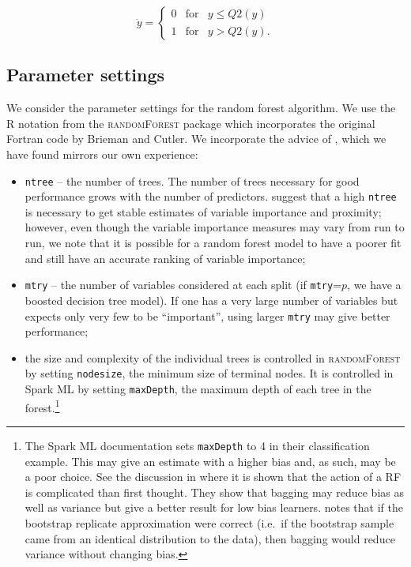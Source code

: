 \documentclass[10pt,letterpaper]{article}
\newcommand{\randomforest}{\textsc{randomForest}\xspace}
\newcommand{\mtry}{\texttt{mtry}\xspace}
\newcommand{\ntree}{\texttt{ntree}\xspace}
\begin{document}
$$
\ddot{y} =    \left\{ \begin{array}{rcl}
			  0 & \mbox{for} & y \leq Q2(y) \\
			  1 & \mbox{for} & y > Q2(y).
		 \end{array}\right. 
$$


\subsection{Parameter settings}
We consider the parameter settings for the random forest algorithm. We use the R notation from the \randomforest
package \cite{Liaw.and.Weiner.2002} which incorporates the original Fortran code by Brieman and Cutler.  We incorporate
the advice of \cite{Liaw.and.Weiner.2002}, which we have found mirrors our own experience:
\begin{itemize}
\item \ntree{}  -- the number of trees.  The number of trees necessary for good performance grows with the number of
  predictors.  \cite{Liaw.and.Weiner.2002} suggest that a high \ntree is necessary to get stable estimates of variable
  importance and proximity; however, even though the variable importance measures may vary from run to run, we note that
  it is possible for a random forest model to have a poorer fit and still have an accurate ranking of variable
  importance;
\item \mtry{}  -- the number of variables considered at each split (if \mtry=$p$, we have a boosted decision
  tree model).  If one has a very large number of variables but expects only very few to be ``important'', using larger \mtry may give
  better performance;
\item the size and complexity of the individual trees is controlled in \randomforest by setting \texttt{nodesize}, the
  minimum size of terminal nodes. It is controlled in Spark ML by setting \texttt{maxDepth}, the maximum depth of each
  tree in the forest.\footnote{The Spark ML documentation \cite{Spark.2016} sets \texttt{maxDepth} to 4 in their
    classification example. This may give an estimate with a higher bias and, as such, may be a poor choice. See the
    discussion in \cite{Dietterich.2002} where it is shown that the action of a RF is complicated than first
    thought. They show that bagging may reduce bias as well as variance but give a better result for low bias
    learners. \cite{Dietterich.2002} notes that if the bootstrap replicate approximation were correct (i.e.~if the
    bootstrap sample came from an identical distribution to the data), then bagging would reduce variance without
    changing bias.}
\end{itemize}
\end{document}
